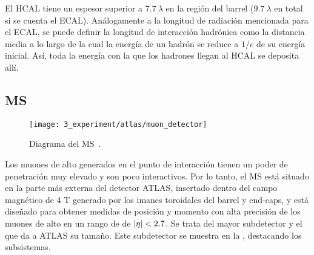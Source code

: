El \ac{HCAL} tiene un espesor superior a \(7.7~\lambda\) en la región del barrel (\(9.7~\lambda\) en total si se cuenta el \ac{ECAL}). Análogamente a la longitud de radiación mencionada para el \ac{ECAL}, se puede definir la longitud de interacción hadrónica como la distancia media a lo largo de la cual la energía de un hadrón se reduce a \(1/e\) de su energía inicial. Así, toda la energía con la que los hadrones llegan al \ac{HCAL} se deposita allí.





\subsection{\acf{MS}}

\begin{figure}[ht!]
    \centering
    \texttt{[image: 3\_experiment/atlas/muon\_detector]}
    \caption{Diagrama del \acf{MS}~\cite{ATLAS}.}
    \label{fig:atlas:atlas:muon_spectrometer:muon_spectrometer}
\end{figure}

Los muones de alto \pt generados en el punto de interacción tienen un poder de penetración muy elevado y son poco interactivos. Por lo tanto, el \ac{MS} \cite{ATLAS-Muon-TDR} está situado en la parte más externa del detector \ac{ATLAS}, insertado dentro del campo magnético de 4 T generado por los imanes toroidales del barrel y end-caps, y está diseñado para obtener medidas de posición y momento con alta precisión de los muones de alto \pt en un rango de \abseta de \(|\eta|<2.7\). Se trata del mayor subdetector y el que da a \ac{ATLAS} su tamaño. Este subdetector se muestra en la \Fig{\ref{fig:atlas:atlas:muon_spectrometer:muon_spectrometer}}, destacando los subsistemas.


